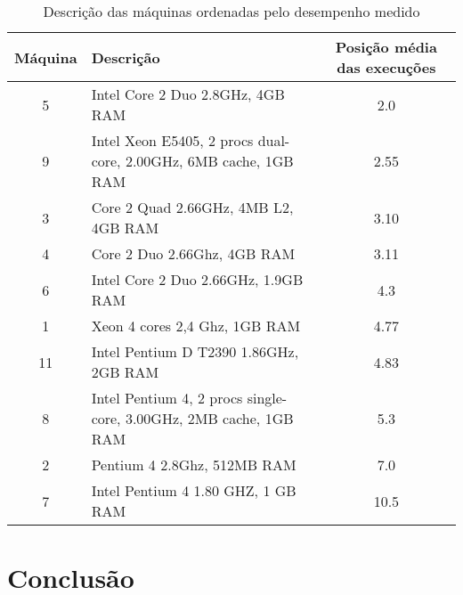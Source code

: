 \documentclass[10pt,a4paper]{article}
\begin{document}
\begin{table}[h!]
\caption{Descrição das máquinas ordenadas pelo desempenho medido}
\begin{tabular}{clc}
\hline
Máquina & Descrição & Posição média das execuções\\
\hline
5	&	Intel Core 2 Duo 2.8GHz, 4GB RAM & 2.0\\
9 &	Intel Xeon E5405, 2 procs dual-core, 2.00GHz, 6MB cache, 1GB
RAM & 2.55\\
3	&	Core 2 Quad 2.66GHz, 4MB L2, 4GB RAM & 3.10\\
4	&	Core 2 Duo 2.66Ghz, 4GB RAM & 3.11\\
6	&	Intel Core 2 Duo 2.66GHz, 1.9GB RAM & 4.3 \\
1	&	  Xeon 4 cores 2,4 Ghz, 1GB RAM & 4.77\\
11 &	Intel Pentium D T2390 1.86GHz, 2GB RAM & 4.83\\
8 &	Intel Pentium 4, 2 procs single-core, 3.00GHz, 2MB cache, 1GB
RAM & 5.3\\
2	&	Pentium 4 2.8Ghz, 512MB RAM & 7.0\\
7	&	Intel Pentium 4 1.80 GHZ, 1 GB RAM & 10.5\\
\hline
\end{tabular}
\end{table}


\section{Conclusão}




\begin{small}
  
\end{small}
\end{document}
